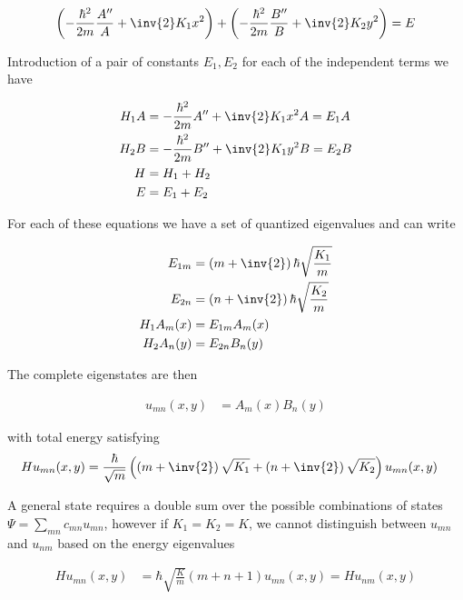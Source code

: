 \begin{align}\label{eqn:desaiCh9:401}
\left( -\frac{\hbar^2}{2m} \frac{A''}{A} + \inv{2} K_1 x^2 \right)
+\left( -\frac{\hbar^2}{2m} \frac{B''}{B} + \inv{2} K_2 y^2 \right)
= E
\end{align}

Introduction of a pair of constants $E_1, E_2$ for each of the independent terms we have

\begin{align}\label{eqn:desaiCh9:403}
H_1 A &= -\frac{\hbar^2}{2m} A'' + \inv{2} K_1 x^2 A = E_1 A \\
H_2 B &= -\frac{\hbar^2}{2m} B'' + \inv{2} K_1 y^2 B = E_2 B \\
H &= H_1 + H_2 \\
E  &= E_1 + E_2
\end{align}

For each of these equations we have a set of quantized eigenvalues and can write

\begin{align}\label{eqn:desaiCh9:404}
E_{1m} &= \left(m + \inv{2}\right) \hbar \sqrt{\frac{K_1}{m}} \\
E_{2n} &= \left(n + \inv{2}\right) \hbar \sqrt{\frac{K_2}{m}} \\
H_1 A_m(x) &= E_{1m} A_m(x) \\
H_2 A_n(y) &= E_{2n} B_n(y)
\end{align}

The complete eigenstates are then

\begin{align}\label{eqn:desaiCh9:405}
u_{mn}(x,y) &= A_m(x) B_n(y)
\end{align}

with total energy satisfying
\begin{align}\label{eqn:desaiCh9:406}
H u_{mn}(x,y) &=
\frac{\hbar}{\sqrt{m}} \left( \left(m + \inv{2}\right) \sqrt{K_1} + \left(n + \inv{2}\right) \sqrt{K_2} \right) u_{mn}(x,y)
\end{align}

A general state requires a double sum over the possible combinations of states $\Psi = \sum_{mn} c_{mn} u_{mn}$, however if $K_1 = K_2 = K$, we cannot distinguish between $u_{mn}$ and $u_{nm}$ based on the energy eigenvalues

\begin{align}\label{eqn:desaiCh9:407}
H u_{mn}(x,y) &= \hbar\sqrt{\frac{K}{m}} \left( m + n + 1 \right) u_{mn}(x,y) = H u_{nm}(x,y)
\end{align}

